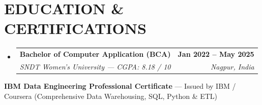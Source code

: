 \documentclass[letterpaper,10pt]{article}
\makeatletter
\newcommand{\resumeSubheading}[4]{
  \vspace{1pt}\item
  \begin{tabular*}{1.0\textwidth}[t]{l@{\extracolsep{\fill}}r}
    \textbf{\textcolor{highlightblue}{#1}} & \textbf{\small \color{dark-grey} #2} \\
    \textit{\small \color{body-black} #3} & \textit{\small \color{dark-grey} #4}
  \end{tabular*}\vspace{-1pt}
}
\newcommand{\resumeSubHeadingListStart}{\begin{itemize}[leftmargin=0.0in, label={}]}
\newcommand{\resumeSubHeadingListEnd}{\end{itemize}}
\makeatother
\begin{document}
\section{EDUCATION \& CERTIFICATIONS}
\resumeSubHeadingListStart
  \resumeSubheading
    {Bachelor of Computer Application (BCA)}{Jan 2022 -- May 2025}
    {SNDT Women's University --- CGPA: 8.18 / 10}{Nagpur, India}
\resumeSubHeadingListEnd
\vspace{1pt}
\begin{itemize}[leftmargin=0.18in, label=\textcolor{highlightblue}{\raisebox{0.8pt}{\scriptsize\faCircle}}, itemsep=1.5pt, topsep=1pt]
  \small{\item{
    \textbf{IBM Data Engineering Professional Certificate} --- Issued by IBM / Coursera (Comprehensive Data Warehousing, SQL, Python \& ETL)
  }}
\end{itemize}
\end{document}
